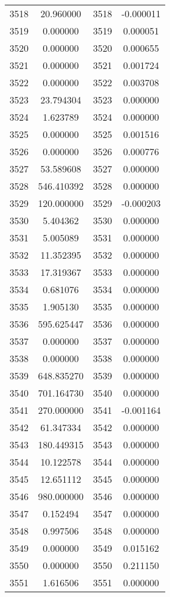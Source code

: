 \documentclass[12pt]{article}
\begin{document}
\begin{longtable}{@{}cccc@{}}
3518 & 20.960000 & 3518 & -0.000011 \\
3519 & 0.000000 & 3519 & 0.000051 \\
3520 & 0.000000 & 3520 & 0.000655 \\
3521 & 0.000000 & 3521 & 0.001724 \\
3522 & 0.000000 & 3522 & 0.003708 \\
3523 & 23.794304 & 3523 & 0.000000 \\
3524 & 1.623789 & 3524 & 0.000000 \\
3525 & 0.000000 & 3525 & 0.001516 \\
3526 & 0.000000 & 3526 & 0.000776 \\
3527 & 53.589608 & 3527 & 0.000000 \\
3528 & 546.410392 & 3528 & 0.000000 \\
3529 & 120.000000 & 3529 & -0.000203 \\
3530 & 5.404362 & 3530 & 0.000000 \\
3531 & 5.005089 & 3531 & 0.000000 \\
3532 & 11.352395 & 3532 & 0.000000 \\
3533 & 17.319367 & 3533 & 0.000000 \\
3534 & 0.681076 & 3534 & 0.000000 \\
3535 & 1.905130 & 3535 & 0.000000 \\
3536 & 595.625447 & 3536 & 0.000000 \\
3537 & 0.000000 & 3537 & 0.000000 \\
3538 & 0.000000 & 3538 & 0.000000 \\
3539 & 648.835270 & 3539 & 0.000000 \\
3540 & 701.164730 & 3540 & 0.000000 \\
3541 & 270.000000 & 3541 & -0.001164 \\
3542 & 61.347334 & 3542 & 0.000000 \\
3543 & 180.449315 & 3543 & 0.000000 \\
3544 & 10.122578 & 3544 & 0.000000 \\
3545 & 12.651112 & 3545 & 0.000000 \\
3546 & 980.000000 & 3546 & 0.000000 \\
3547 & 0.152494 & 3547 & 0.000000 \\
3548 & 0.997506 & 3548 & 0.000000 \\
3549 & 0.000000 & 3549 & 0.015162 \\
3550 & 0.000000 & 3550 & 0.211150 \\
3551 & 1.616506 & 3551 & 0.000000 \\

\end{longtable}
\end{document}
